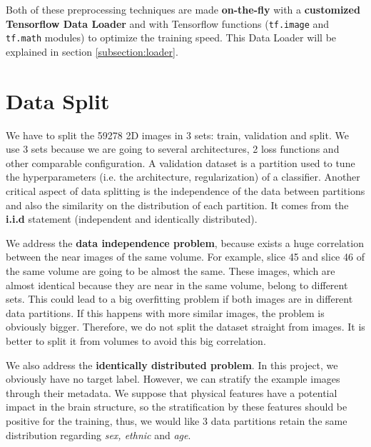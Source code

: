 Both of these preprocessing techniques are made \textbf{on-the-fly} with a \textbf{customized Tensorflow Data Loader} and with Tensorflow functions (\texttt{tf.image} and \texttt{tf.math} modules) to optimize the training speed. This Data Loader will be explained in section \ref{subsection:loader}.

\section{Data Split}
\label{subsection:datasplitting}

We have to split the 59278 2D images in 3 sets: train, validation and split. We use 3 sets because we are going to several architectures, 2 loss functions and other comparable configuration. A validation dataset is a partition used to tune the hyperparameters (i.e. the architecture, regularization) of a classifier. Another critical aspect of data splitting is the independence of the data between partitions and also the similarity on the distribution of each partition. It comes from the \textbf{i.i.d} statement (independent and identically distributed). 

We address the \textbf{data independence problem}, because exists a huge correlation between the near images of the same volume. For example, slice 45 and slice 46 of the same volume are going to be almost the same. These images, which are almost identical because they are near in the same volume, belong to different sets. This could lead to a big overfitting problem if both images are in different data partitions. If this happens with more similar images, the problem is obviously bigger. Therefore, we do not split the dataset straight from images. It is better to split it from volumes to avoid this big correlation.

We also address the \textbf{identically distributed problem}. In this project, we obviously have no target label. However, we can stratify the example images through their metadata. We suppose that physical features have a potential impact in the brain structure, so the stratification by these features should be positive for the training, thus, we would like 3 data partitions retain the same distribution regarding \textit{sex, ethnic} and \textit{age}.

